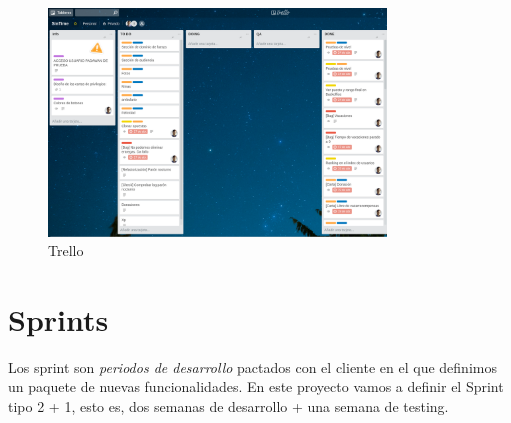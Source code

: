 \begin{figure}[ht]
	\centering
	\includegraphics[width=0.8\textwidth]{imagenes/trello.png}
	\caption{Trello}
	\label{trello}
\end{figure}

\section{Sprints}
Los sprint son \textit{periodos de desarrollo} pactados con el cliente en el que definimos un paquete de nuevas funcionalidades. En este proyecto vamos a definir el Sprint tipo 2 + 1, esto es, dos semanas de desarrollo + una semana de testing.
